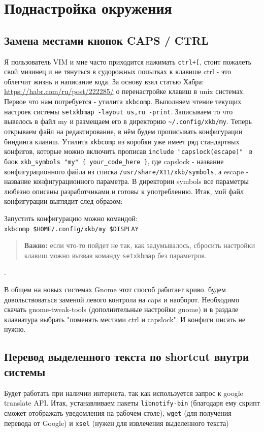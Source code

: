 \documentclass[a4paper, 12pt]{report}
\begin{document}
\chapter{Поднастройка окружения}
\section{Замена местами кнопок CAPS / CTRL} Я пользователь VIM и мне часто приходится нажимать \lstinline|ctrl+[|, стоит пожалеть свой мизинец и не тянуться в судорожных попытках к клавише ctrl - это облегчит жизнь и написание кода. За основу взял статью Хабра: \href{https://habr.com/ru/post/222285/}{https://habr.com/ru/post/222285/} о перенастройке клавиш в unix системах. Первое что нам потребуется - утилита \lstinline|xkbcomp|.
Выполняем чтение текущих настроек системы \lstinline|setxkbmap -layout us,ru -print|. Записываем то что вывелось в файл my и размещаем его в директорию \lstinline|~/.config/xkb/my|. Теперь открываем файл на редактирование, в нём будем прописывать конфигурации биндинга клавиш.
Утилита \lstinline|xkbcomp| из коробки уже имеет ряд стандартных конфигов, которые можно включить прописав \lstinline|include "capslock(escape)" | в блок \lstinline|xkb_symbols "my" { your_code_here }|, где capslock - название конфигурационного файла из списка \lstinline|/usr/share/X11/xkb/symbols|, а escape - название конфигурационного параметра. В директории symbols все параметры любезно описаны разработчиками и готовы к употреблению. 
Итак, мой файл конфигурации выглядит след образом: 

Запустить конфигурацию можно командой:\\ \lstinline|xkbcomp $HOME/.config/xkb/my $DISPLAY|\\

\begin{quote}
\textbf{Важно:} если что-то пойдет не так, как задумывалось, сбросить настройки клавиш можно вызвав команду \lstinline|setxkbmap| без параметров.
\end{quote}.

В общем на новых системах Gnome этот способ работает криво. будем довольствоваться заменой левого контрола на caps и наоборот. Необходимо скачать gnome-tweak-tools (дополнительные настройки gnome) и в раздале клавиатура выбрать "поменять местами ctrl и capslock". И конфиги писать не нужно.

\section{Перевод выделенного текста по shortcut внутри системы} Будет работать при наличии интернета, так как используется запрос к google translate API. Итак, устанавливаем пакеты \lstinline|libnotify-bin| (благодаря ему скрипт сможет отображать уведомления на рабочем столе), \lstinline|wget| (для получения перевода от Google) и \lstinline|xsel| (нужен для извлечения выделенного текста)\\
\end{document}
